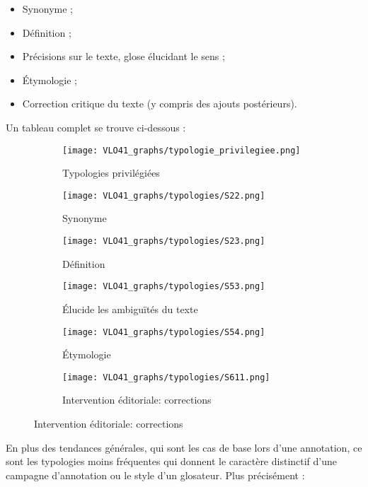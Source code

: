 \documentclass[a4paper, twoside, 12pt]{book}
\begin{document}
{\begin{itemize}
    \item  {} Synonyme ;
    \item  {} Définition ;
    \item   {} Précisions sur le texte, glose élucidant le sens ;
    \item   {} Étymologie ;
    \item   {} Correction critique du texte (y compris des ajouts postérieurs).
\end{itemize}

Un tableau complet se trouve ci-dessous : 
\begin{figure}[H]
    \begin{subfigure}{0.40\textwidth}
    \centering
    \texttt{[image: VLO41\_graphs/typologie\_privilegiee.png]}
    \caption{Typologies privilégiées}
    \end{subfigure}
    \begin{subfigure}{0,40\linewidth}
    \centering
    \texttt{[image: VLO41\_graphs/typologies/S22.png]}
    \caption{Synonyme}
    \end{subfigure}
    \begin{subfigure}{0,40\linewidth}
    \centering
    \texttt{[image: VLO41\_graphs/typologies/S23.png]}
    \caption{Définition}
    \end{subfigure}
     \begin{subfigure}{0,40\linewidth}
    \centering
    \texttt{[image: VLO41\_graphs/typologies/S53.png]}
    \caption{Élucide les ambiguïtés du texte}
    \end{subfigure}
    \begin{subfigure}{0,40\linewidth}
    \centering
    \texttt{[image: VLO41\_graphs/typologies/S54.png]}
    \caption{Étymologie}
    \end{subfigure}
        \begin{subfigure}{0,80\linewidth}
    \centering
    \texttt{[image: VLO41\_graphs/typologies/S611.png]}
    \caption{Intervention éditoriale: corrections}
    \end{subfigure}
\end{figure} 

\clearpage

En plus des tendances générales, qui sont les cas de base lors d'une annotation, ce sont les typologies moins fréquentes qui donnent le caractère distinctif d'une campagne d'annotation ou le \og{}style\fg{} d'un glosateur. Plus précisément :

}
\end{document}
